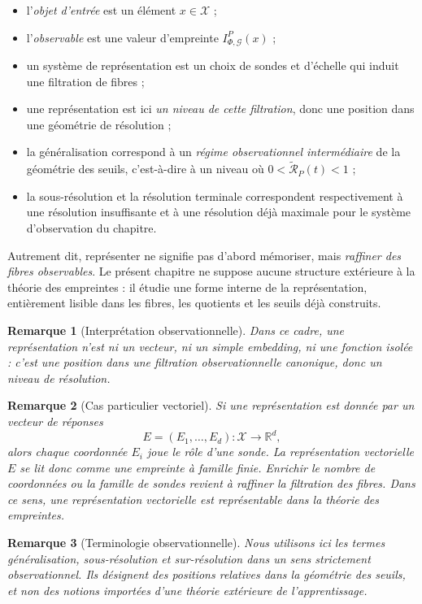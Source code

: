 \documentclass[11pt,a4paper]{article}
\newtheorem{remark}{Remarque}
\begin{document}
\begin{appendices}
\begin{itemize}[leftmargin=1.4em]
\item l'\emph{objet d'entrée} est un élément \(x\in\mathcal X\) ;
\item l'\emph{observable} est une valeur d'empreinte \(I_{\Phi,\mathcal G}^P(x)\) ;
\item un système de représentation est un choix de sondes et d'échelle qui induit une filtration de fibres ;
\item une représentation est ici \emph{un niveau de cette filtration}, donc une position dans une géométrie de résolution ;
\item la généralisation correspond à un \emph{régime observationnel intermédiaire} de la géométrie des seuils, c'est-à-dire à un niveau où \(0<\widetilde{\mathcal R}_P(t)<1\) ;
\item la sous-résolution et la résolution terminale correspondent respectivement à une résolution insuffisante et à une résolution déjà maximale pour le système d'observation du chapitre.
\end{itemize}

Autrement dit, représenter ne signifie pas d'abord mémoriser, mais \emph{raffiner des fibres observables}.  
Le présent chapitre ne suppose aucune structure extérieure à la théorie des empreintes : il étudie une forme interne de la représentation, entièrement lisible dans les fibres, les quotients et les seuils déjà construits.

\begin{remark}[Interprétation observationnelle]
Dans ce cadre, une représentation n'est ni un vecteur, ni un simple embedding, ni une fonction isolée : c'est une position dans une filtration observationnelle canonique, donc un niveau de résolution.
\end{remark}

\begin{remark}[Cas particulier vectoriel]
Si une représentation est donnée par un vecteur de réponses
\[
E=(E_1,\ldots,E_d):\mathcal X\to\mathbb R^d,
\]
alors chaque coordonnée \(E_i\) joue le rôle d'une sonde. La représentation vectorielle \(E\) se lit donc comme une empreinte à famille finie. Enrichir le nombre de coordonnées ou la famille de sondes revient à raffiner la filtration des fibres. Dans ce sens, une représentation vectorielle est représentable dans la théorie des empreintes.
\end{remark}

\begin{remark}[Terminologie observationnelle]
Nous utilisons ici les termes \emph{généralisation}, \emph{sous-résolution} et \emph{sur-résolution} dans un sens strictement observationnel. Ils désignent des positions relatives dans la géométrie des seuils, et non des notions importées d'une théorie extérieure de l'apprentissage.
\end{remark}


\end{appendices}
\end{document}
